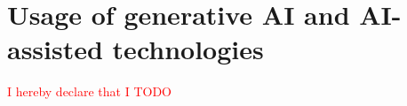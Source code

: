 \section*{Usage of generative AI and AI-assisted technologies}
\label{sec:usage_AI}

\textcolor{red}{I hereby declare that I TODO}